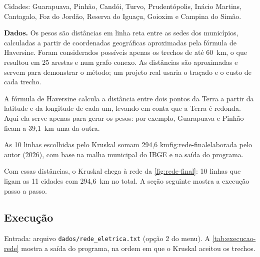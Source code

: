 \documentclass[a4paper]{article}
\begin{document}
Cidades: Guarapuava, Pinhão, Candói, Turvo, Prudentópolis, Inácio Martins,
Cantagalo, Foz do Jordão, Reserva do Iguaçu, Goioxim e Campina do Simão.

\textbf{Dados.} Os pesos são distâncias em linha reta entre as sedes dos
municípios, calculadas a partir de coordenadas geográficas aproximadas pela
fórmula de Haversine. Foram considerados possíveis apenas os trechos de até
60~km, o que resultou em 25 arestas e num grafo conexo. As distâncias são
aproximadas e servem para demonstrar o método; um projeto real usaria o traçado
e o custo de cada trecho.

A fórmula de Haversine calcula a distância entre dois pontos da Terra a partir da
latitude e da longitude de cada um, levando em conta que a Terra é redonda. Aqui
ela serve apenas para gerar os pesos: por exemplo, Guarapuava e Pinhão ficam a
39,1~km uma da outra.

\begin{figura}{As 10 linhas escolhidas pelo Kruskal somam 294,6 km}{fig:rede-final}{elaborada pelo autor (2026), com base na malha municipal do IBGE \cite{geodatabr} e na saída do programa.}
\resizebox{0.92\textwidth}{!}{}
\par{}
\end{figura}

Com essas distâncias, o Kruskal chega à rede da \cref{fig:rede-final}: 10 linhas
que ligam as 11 cidades com 294,6~km no total. A seção seguinte mostra a execução
passo a passo.

\subsection{Execução}

Entrada: arquivo \texttt{dados/rede\_eletrica.txt} (opção 2 do menu). A
\cref{tab:execucao-rede} mostra a saída do programa, na ordem em que o Kruskal
aceitou os trechos.
\end{document}
